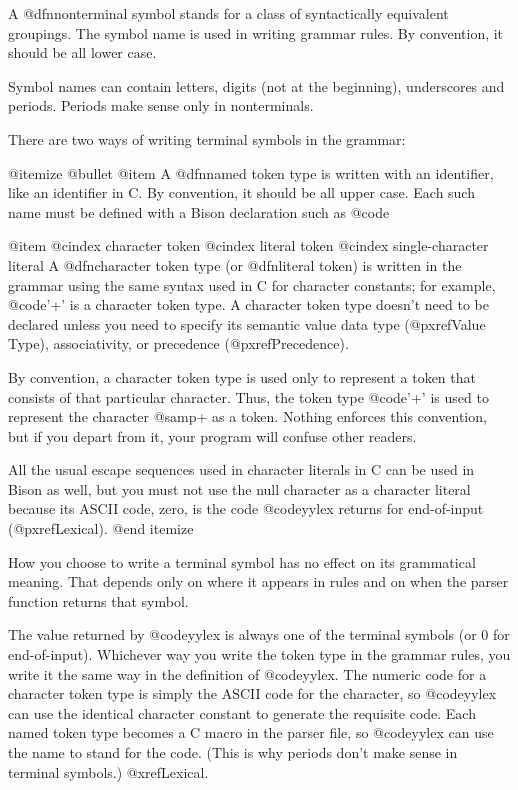 {{{{{{{{{{{{{{{{{A @dfn{nonterminal symbol} stands for a class of syntactically equivalent
groupings.  The symbol name is used in writing grammar rules.  By convention,
it should be all lower case.

Symbol names can contain letters, digits (not at the beginning),
underscores and periods.  Periods make sense only in nonterminals.

There are two ways of writing terminal symbols in the grammar:

@itemize @bullet
@item
A @dfn{named token type} is written with an identifier, like an
identifier in C.  By convention, it should be all upper case.  Each
such name must be defined with a Bison declaration such as
@code{%

@item
@cindex character token
@cindex literal token
@cindex single-character literal
A @dfn{character token type} (or @dfn{literal token}) is written in
the grammar using the same syntax used in C for character constants;
for example, @code{'+'} is a character token type.  A character token
type doesn't need to be declared unless you need to specify its
semantic value data type (@pxref{Value Type}), associativity, or
precedence (@pxref{Precedence}).

By convention, a character token type is used only to represent a
token that consists of that particular character.  Thus, the token
type @code{'+'} is used to represent the character @samp{+} as a
token.  Nothing enforces this convention, but if you depart from it,
your program will confuse other readers.

All the usual escape sequences used in character literals in C can be
used in Bison as well, but you must not use the null character as a
character literal because its ASCII code, zero, is the code
@code{yylex} returns for end-of-input (@pxref{Lexical}).
@end itemize

How you choose to write a terminal symbol has no effect on its
grammatical meaning.  That depends only on where it appears in rules and
on when the parser function returns that symbol.

The value returned by @code{yylex} is always one of the terminal symbols
(or 0 for end-of-input).  Whichever way you write the token type in the
grammar rules, you write it the same way in the definition of @code{yylex}.
The numeric code for a character token type is simply the ASCII code for
the character, so @code{yylex} can use the identical character constant to
generate the requisite code.  Each named token type becomes a C macro in
the parser file, so @code{yylex} can use the name to stand for the code.
(This is why periods don't make sense in terminal symbols.)  @xref{Lexical}.

}}}}}}}}}}}}}}}}}}
